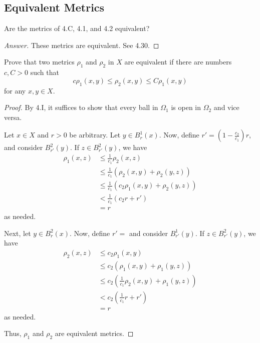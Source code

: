 \subsection{Equivalent Metrics}

\begin{minorEx}
    Are the metrics of 4.C, 4.1, and 4.2 equivalent?
\end{minorEx}

\begin{proof}[Answer]
    These metrics are equivalent. See 4.30. 
\end{proof}

\begin{minorEx}
    Prove that two metrics $\rho_1$ and $\rho_2$ in $X$ are equivalent if there
    are numbers $c, C > 0$ such that
    \[
        c \rho_1(x,y) \leq \rho_2(x,y) \leq C \rho_1(x,y)
    \]
    for any $x, y \in X$.
\end{minorEx}

\begin{proof}
    By 4.I, it suffices to show that every ball in $\Omega_1$ is open in
    $\Omega_2$ and vice versa.

    Let $x \in X$ and $r > 0$ be arbitrary. Let $y \in B_{r}^{1}(x)$. Now,
    define $r' = (1 - \tfrac{c_2}{c_1})r$, and consider $B_{r'}^{2}(y)$. If $z \in B_{r'}^{2}(y)$,
    we have
    \begin{align*}
        \rho_1(x,z) &\leq \tfrac{1}{c_1} \rho_2(x,z) \\
        &\leq \tfrac{1}{c_1} (\rho_2(x,y) + \rho_2(y,z)) \\
        &\leq \tfrac{1}{c_1} (c_2\rho_1(x,y) + \rho_2(y,z)) \\
        &< \tfrac{1}{c_1}(c_2 r + r') \\
        &= r
    \end{align*}
    as needed.

    Next, let $y \in B_{r}^{2}(x)$. Now, define $r' = $ and consider
    $B_{r'}^1(y)$. If $z \in B_{r'}^2(y)$, we have
    \begin{align*}
        \rho_2(x,z) &\leq c_2 \rho_1(x,y) \\
        &\leq c_2(\rho_1(x,y) + \rho_1(y,z)) \\
        &\leq c_2(\tfrac{1}{c_1}\rho_2(x,y) + \rho_1(y,z)) \\
        &< c_2 (\tfrac{1}{c_1} r + r') \\
        &= r
    \end{align*}
    as needed.

    Thus, $\rho_1$ and $\rho_2$ are equivalent metrics.
\end{proof}

